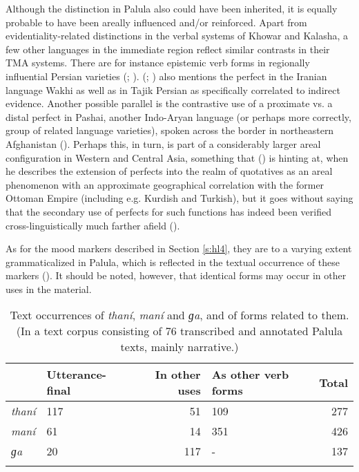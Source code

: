 \documentclass[output=paper]{langsci/langscibook}
\begin{document}
Although the distinction in Palula also could have been inherited, it is equally probable to have been areally influenced and/or reinforced. Apart from evidential\-ity-related distinctions in the verbal systems of Khowar and Kalasha, a few other languages in the immediate region reflect similar contrasts in their TMA systems. There are for instance epistemic verb forms in regionally influential Persian varieties (\citealt{Perry2000}; \citealt[461]{WindfuhrPerry2009}). \citeauthor{Bashir2010} (\citeyear[14–15]{Bashir2010}; \citeyear[839]{Bashir2009}) also mentions the perfect in the Iranian language Wakhi as well as in Tajik Persian as specifically correlated to indirect evidence. Another possible parallel is the contrastive use of a proximate vs. a distal perfect in Pashai, another Indo-Aryan language (or perhaps more correctly, group of related language varieties), spoken across the border in northeastern Afghanistan (\citealt[295--297]{Lehr2014}). Perhaps this, in turn, is part of a considerably larger areal configuration in Western and Central Asia, something that \citeauthor{Dahl1985} (\citeyear[152]{Dahl1985}) is hinting at, when he describes the extension of perfects into the realm of quotatives as an areal phenomenon with an approximate geographical correlation with the former Ottoman Empire (including e.g. Kurdish and Turkish), but it goes without saying that the secondary use of perfects for such functions has indeed been verified cross-linguistically much farther afield (\citealt[112]{Aikhenvald2004}).

As for the mood markers described in Section ‎\ref{s:hl4}, they are to a varying extent grammaticalized in Palula, which is reflected in the textual occurrence of these markers (). It should be noted, however, that identical forms may occur in other uses in the material.


\begin{table}
\begin{tabularx}{\textwidth}{lYrYr}
\lsptoprule
& \textbf{Utterance-final} & \textbf{In other uses} & \textbf{As other verb forms} & \textbf{Total}\\
\midrule
   \textit{thaní} & 117 & 51 & 109 & 277\\
	\textit{maní} & 61 & 14 & 351 & 426\\
	\textit{ɡa} & 20 & 117 & - & 137\\
\lspbottomrule
\end{tabularx}
\caption{Text occurrences of \textit{thaní}, \textit{maní} and \textit{ɡa}, and of forms related to them. (In a text corpus consisting of 76 transcribed and annotated Palula texts, mainly narrative.)}
 \label{tab:hl1}
\end{table}	
\end{document}

